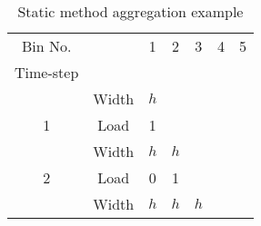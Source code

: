 \documentclass[review,12pt]{elsarticle}
\begin{document}
\begin{table}[htb!]
\centering
\caption{Static method aggregation example}
\label{tab:static example}
\begin{tabular}{|ccccccc|}
\hline
Bin No.                                   &                            & 1                        & 2                                             & 3                                             & 4                                                                    & 5                                               \\
Time-step                                 &                            &                          &                                               &                                               &                                                                      &                                                 \\ \hline
\multicolumn{1}{|c|}{}                    & \multicolumn{1}{c|}{Width} & \multicolumn{1}{c|}{$h$} & \multicolumn{1}{c|}{\cellcolor[HTML]{9B9B9B}} & \multicolumn{1}{c|}{\cellcolor[HTML]{9B9B9B}} & \multicolumn{1}{c|}{\cellcolor[HTML]{9B9B9B}}                        & \cellcolor[HTML]{9B9B9B}                        \\ \cline{2-7} 
\multicolumn{1}{|c|}{\multirow{-2}{*}{1}} & \multicolumn{1}{c|}{Load}  & \multicolumn{1}{c|}{1}   & \multicolumn{1}{c|}{\cellcolor[HTML]{9B9B9B}} & \multicolumn{1}{c|}{\cellcolor[HTML]{9B9B9B}} & \multicolumn{1}{c|}{\cellcolor[HTML]{9B9B9B}}                        & \cellcolor[HTML]{9B9B9B}                        \\ \hline
\multicolumn{1}{|c|}{}                    & \multicolumn{1}{c|}{Width} & \multicolumn{1}{c|}{$h$} & \multicolumn{1}{c|}{$h$}                      & \multicolumn{1}{c|}{\cellcolor[HTML]{9B9B9B}} & \multicolumn{1}{c|}{\cellcolor[HTML]{9B9B9B}}                        & \cellcolor[HTML]{9B9B9B}                        \\ \cline{2-7} 
\multicolumn{1}{|c|}{\multirow{-2}{*}{2}} & \multicolumn{1}{c|}{Load}  & \multicolumn{1}{c|}{0}   & \multicolumn{1}{c|}{1}                        & \multicolumn{1}{c|}{\cellcolor[HTML]{9B9B9B}} & \multicolumn{1}{c|}{\cellcolor[HTML]{9B9B9B}}                        & \cellcolor[HTML]{9B9B9B}                        \\ \hline
\multicolumn{1}{|c|}{}                    & \multicolumn{1}{c|}{Width} & \multicolumn{1}{c|}{$h$} & \multicolumn{1}{c|}{$h$}                      & \multicolumn{1}{c|}{$h$}                      & \multicolumn{1}{c|}{\cellcolor[HTML]{9B9B9B}{\color[HTML]{9B9B9B} }} & \cellcolor[HTML]{9B9B9B}{\color[HTML]{9B9B9B} } \\ \cline{2-7} 

\end{tabular}
\end{table}
\end{document}
